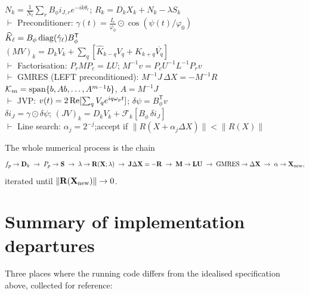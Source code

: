 \begin{center}
\begin{minipage}{0.95\textwidth}
\begin{tabbing}
\>\>\>\> \phantom{$\vdash$} $N_k = \frac{1}{N_t}\sum_r B_\phi i_{J,r} e^{-ik\theta_r}$;\quad
         $R_k = D_kX_k + N_k - \lambda S_k$ \\[3pt]
\>\>\>\> $\vdash$ Preconditioner: $\gamma(t) = \frac{I_c}{\varphi_0}\odot\cos(\psi(t)/\varphi_0)$ \\
\>\>\>\> \phantom{$\vdash$} $\widehat{K}_\ell = B_\phi\operatorname{diag}(\hat\gamma_\ell)B_\phi^{\mathsf T}$ \\
\>\>\>\> \phantom{$\vdash$} $(MV)_k = D_kV_k + \sum_q[\widehat{K}_{k-q}V_q + \widehat{K}_{k+q}\overline{V_q}]$ \\[3pt]
\>\>\>\> $\vdash$ Factorisation: $P_r M P_c = LU$;\quad
         $M^{-1}v = P_c U^{-1}L^{-1}P_r v$ \\[3pt]
\>\>\>\> $\vdash$ GMRES (LEFT preconditioned): $M^{-1}J\,\Delta X = -M^{-1}R$ \\
\>\>\>\> \phantom{$\vdash$} $\mathcal{K}_m = \operatorname{span}\{b, Ab, \dots, A^{m-1}b\}$,\quad
         $A = M^{-1}J$ \\[3pt]
\>\>\>\> $\vdash$ JVP: $v(t) = 2\operatorname{Re}[\sum_q V_q e^{iq\omega_p t}]$;\quad
         $\delta\psi = B_\phi^{\mathsf T}v$ \\
\>\>\>\> \phantom{$\vdash$} $\delta i_J = \gamma\odot\delta\psi$;\quad
         $(JV)_k = D_kV_k + \mathcal{F}_k[B_\phi\,\delta i_J]$ \\[3pt]
\>\>\>\> $\vdash$ Line search: $\alpha_j = 2^{-j}$;\quad accept if
         $\|R(X+\alpha_j\Delta X)\| < \|R(X)\|$
\end{tabbing}
\end{minipage}
\end{center}

\medskip
The whole numerical process is the chain
\begin{equation}
  f_p \to \mathbf{D}_k
  \;\to\;
  P_p \to \mathbf{S}
  \;\to\;
  \lambda \to \mathbf{R}(\mathbf{X};\lambda)
  \;\to\;
  \mathbf{J}\Delta\mathbf{X} = -\mathbf{R}
  \;\to\;
  \mathbf{M}\to\mathbf{L}\mathbf{U}
  \;\to\;
  \text{GMRES}\to\Delta\mathbf{X}
  \;\to\;
  \alpha \to \mathbf{X}_{\mathrm{new}},
\end{equation}
iterated until $\|\mathbf{R}(\mathbf{X}_{\mathrm{new}})\|\to 0$.

\section{Summary of implementation departures}

Three places where the running code differs from the idealised specification
above, collected for reference:


